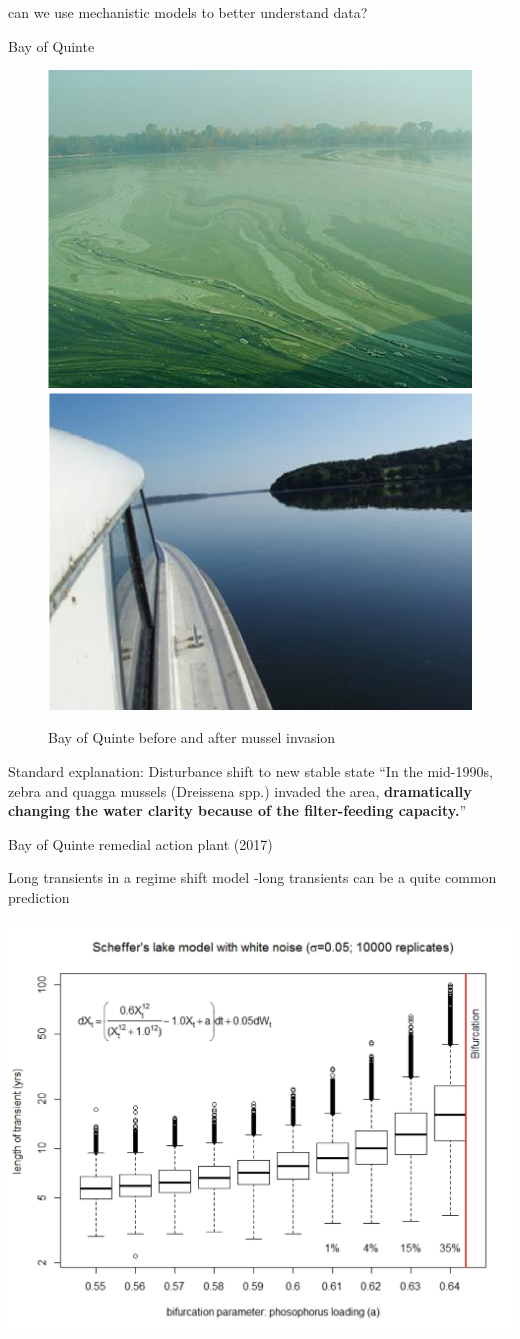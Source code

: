 \documentclass[
  ignorenonframetext,
]{beamer}
\begin{document}
\begin{frame}{can we use mechanistic models to better understand data?}
\begin{block}{Bay of Quinte}
\begin{figure}
\includegraphics[width=0.4\linewidth]{turbid} \includegraphics[width=0.4\linewidth]{clear} \caption{Bay of Quinte before and after mussel invasion}\label{fig:unnamed-chunk-10}
\end{figure}
\end{block}

\begin{block}{Standard explanation: Disturbance shift to new stable
state}
\protect\hypertarget{standard-explanation-disturbance-shift-to-new-stable-state}{}
``In the mid-1990s, zebra and quagga mussels (Dreissena spp.) invaded
the area, \textbf{dramatically changing the water clarity because of the
filter-feeding capacity.}''

Bay of Quinte remedial action plant (2017)
\end{block}

\begin{block}{Long transients in a regime shift model}
\protect\hypertarget{long-transients-in-a-regime-shift-model}{}
-long transients can be a quite common prediction

\begin{center}\includegraphics[width=0.7\linewidth]{transbox} \end{center}


\end{block}
\end{frame}
\end{document}
